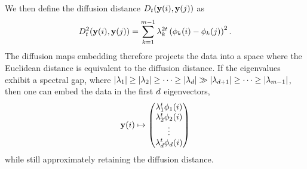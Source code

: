 %
We then define the diffusion distance $D_t (\mathbf{y}(i), \mathbf{y}(j))$ as 
\begin{equation}
D_t^2 (\mathbf{y}(i), \mathbf{y}(j)) = \sum_{k=1}^{m-1} \lambda_k^{2t} \left( \phi_k(i)- \phi_k(j) \right)^2.
\end{equation}
%
The diffusion maps embedding therefore projects the data into a space where the Euclidean distance is equivalent to the diffusion distance. 
%
If the eigenvalues exhibit a spectral gap, where $|\lambda_1| \ge |\lambda_2| \ge \dots \ge |\lambda_d | \gg |\lambda_{d+1} | \ge \dots \ge |\lambda_{m-1}|$, then one can embed the data in the first $d$ eigenvectors, 
\begin{equation} \label{eq:dmaps_embed_reduced}
\mathbf{y}(i) \mapsto 
\begin{pmatrix}
\lambda_1^t \phi_1(i) \\
\lambda_2^t \phi_2(i) \\
\vdots \\
\lambda_{d}^t  \phi_{d}(i)
\end{pmatrix}
\end{equation}
%
while still approximately retaining the diffusion distance. 






